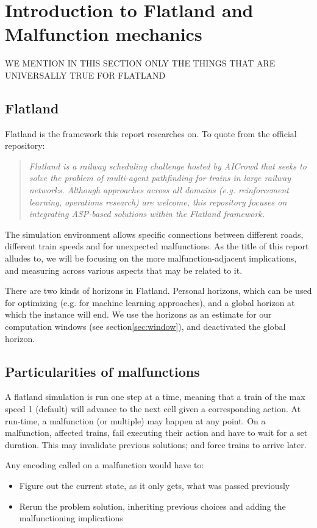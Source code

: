 \section{Introduction to Flatland and Malfunction mechanics}
\color{red} WE MENTION IN THIS SECTION ONLY THE THINGS THAT ARE UNIVERSALLY TRUE FOR FLATLAND \color{black}
\subsection{Flatland}
Flatland\cite{flatland} is the framework this report researches on. To quote from the official repository:
\begin{quote}
\emph{	Flatland is a railway scheduling challenge hosted by AICrowd that seeks to solve the problem of multi-agent pathfinding for trains in large railway networks. Although approaches across all domains (e.g. reinforcement learning, operations research) are welcome, this repository focuses on integrating ASP-based solutions within the Flatland framework.}
\end{quote}

The simulation environment allows specific connections between different roads, different train speeds and for unexpected malfunctions. As the title of this report alludes to, we will be focusing on the more malfunction-adjacent implications, and measuring across various aspects that may be related to it.

There are two kinds of horizons in Flatland. Personal horizons, which can be used for optimizing (e.g. for machine learning approaches), and a global horizon at which the instance will end. We use the horizons as an estimate for our computation windows (see section\ref{sec:window}), and deactivated the global horizon.

\subsection{Particularities of malfunctions}
A flatland simulation is run one step at a time, meaning that a train of the max speed 1 (default) will advance to the next cell given a corresponding action. At run-time, a malfunction (or multiple) may happen at any point. On a malfunction, affected trains, fail executing their action and have to wait for a set duration. This may invalidate previous solutions; and force trains to arrive later.

Any encoding called on a malfunction would have to:
\begin{itemize}
	\item Figure out the current state, as it only gets, what was passed previously
	\item Rerun the problem solution, inheriting previous choices and adding the malfunctioning implications
\end{itemize}

